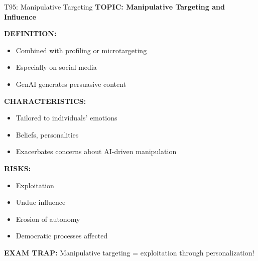 \documentclass[8pt]{beamer}
\begin{document}
	\begin{frame}{T95: Manipulative Targeting}
		\fontsize{6.5}{7.5}\selectfont
		\textbf{TOPIC: Manipulative Targeting and Influence}
		
		\vspace{0.1cm}
		\textbf{DEFINITION:}
		\begin{itemize}
			\item Combined with profiling or microtargeting
			\item Especially on social media
			\item GenAI generates persuasive content
		\end{itemize}
		
		\vspace{0.1cm}
		\textbf{CHARACTERISTICS:}
		\begin{itemize}
			\item Tailored to individuals' emotions
			\item Beliefs, personalities
			\item Exacerbates concerns about AI-driven manipulation
		\end{itemize}
		
		\vspace{0.1cm}
		\textbf{RISKS:}
		\begin{itemize}
			\item Exploitation
			\item Undue influence
			\item Erosion of autonomy
			\item Democratic processes affected
		\end{itemize}
		
		\textcolor{myred}{\textbf{EXAM TRAP:}} Manipulative targeting = \textcolor{myblue}{exploitation through personalization}!
	\end{frame}
	
\end{document}
